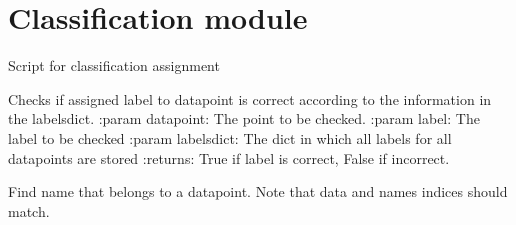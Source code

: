 \documentclass[letterpaper,10pt,english]{sphinxmanual}
\begin{document}
\section{Classification module}
\label{\detokenize{classification:module-classification}}\label{\detokenize{classification:classification-module}}\label{\detokenize{classification::doc}}
\sphinxAtStartPar
Script for classification assignment

\begin{fulllineitems}
\label{\detokenize{classification:classification.checkLabel}}
\sphinxAtStartPar
Checks if assigned label to datapoint is correct according to the information in the labelsdict.
:param datapoint: The point to be checked.
:param label: The label to be checked
:param labelsdict: The dict in which all labels for all datapoints are stored
:returns: True if label is correct, False if incorrect.

\end{fulllineitems}


\begin{fulllineitems}
\label{\detokenize{classification:classification.findName}}
\sphinxAtStartPar
Find name that belongs to a datapoint. Note that data and names indices should match.

\end{fulllineitems}

\end{document}
